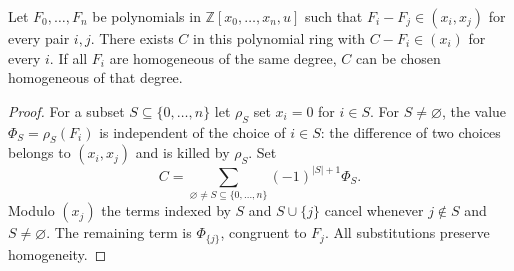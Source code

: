 \begin{lemma}\label{C:interpolation}
Let $F_0,\ldots,F_n$ be polynomials in $\mathbb Z[x_0,\ldots,x_n,u]$ such that $F_i-F_j\in(x_i,x_j)$ for every pair $i,j$. There exists $C$ in this polynomial ring with $C-F_i\in(x_i)$ for every $i$. If all $F_i$ are homogeneous of the same degree, $C$ can be chosen homogeneous of that degree.
\end{lemma}
\begin{proof}
For a subset $S\subseteq\{0,\ldots,n\}$ let $\rho_S$ set $x_i=0$ for $i\in S$. For $S\ne\varnothing$, the value $\Phi_S=\rho_S(F_i)$ is independent of the choice of $i\in S$: the difference of two choices belongs to $(x_i,x_j)$ and is killed by $\rho_S$. Set
\[
 C=\sum_{\varnothing\ne S\subseteq\{0,\ldots,n\}}
       (-1)^{|S|+1}\Phi_S.
\]
Modulo $(x_j)$ the terms indexed by $S$ and $S\cup\{j\}$ cancel whenever $j\notin S$ and $S\ne\varnothing$. The remaining term is $\Phi_{\{j\}}$, congruent to $F_j$. All substitutions preserve homogeneity.
\end{proof}

